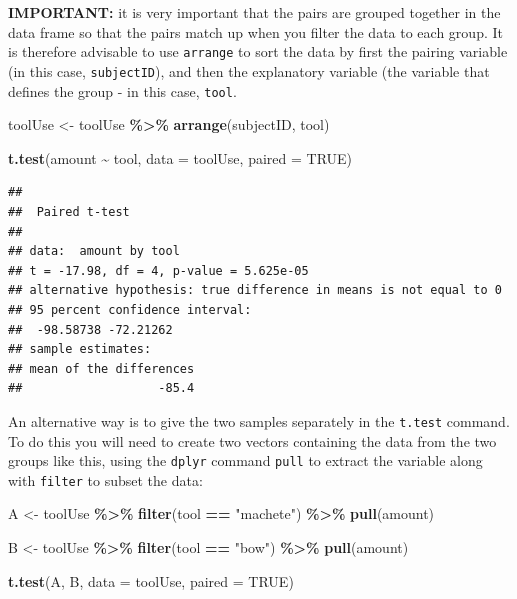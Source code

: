 \documentclass[
  a4paperpaper,
]{book}
\newenvironment{Shaded}{\begin{snugshade}}{\end{snugshade}}
\newcommand{\DataTypeTok}[1]{\textcolor[rgb]{0.13,0.29,0.53}{#1}}
\newcommand{\KeywordTok}[1]{\textcolor[rgb]{0.13,0.29,0.53}{\textbf{#1}}}
\newcommand{\NormalTok}[1]{#1}
\newcommand{\OperatorTok}[1]{\textcolor[rgb]{0.81,0.36,0.00}{\textbf{#1}}}
\newcommand{\OtherTok}[1]{\textcolor[rgb]{0.56,0.35,0.01}{#1}}
\newcommand{\StringTok}[1]{\textcolor[rgb]{0.31,0.60,0.02}{#1}}
\begin{document}
\textbf{IMPORTANT:} it is very important that the pairs are grouped together in the data frame so that the pairs match up when you filter the data to each group. It is therefore advisable to use \texttt{arrange} to sort the data by first the pairing variable (in this case, \texttt{subjectID}), and then the explanatory variable (the variable that defines the group - in this case, \texttt{tool}.

\begin{Shaded}
\begin{Highlighting}[]
\NormalTok{toolUse \textless{}{-}}\StringTok{ }\NormalTok{toolUse }\OperatorTok{\%\textgreater{}\%}\StringTok{ }
\StringTok{  }\KeywordTok{arrange}\NormalTok{(subjectID, tool)}

\KeywordTok{t.test}\NormalTok{(amount }\OperatorTok{\textasciitilde{}}\StringTok{ }\NormalTok{tool, }\DataTypeTok{data =}\NormalTok{ toolUse, }\DataTypeTok{paired =} \OtherTok{TRUE}\NormalTok{)}
\end{Highlighting}
\end{Shaded}

\begin{verbatim}
## 
## 	Paired t-test
## 
## data:  amount by tool
## t = -17.98, df = 4, p-value = 5.625e-05
## alternative hypothesis: true difference in means is not equal to 0
## 95 percent confidence interval:
##  -98.58738 -72.21262
## sample estimates:
## mean of the differences 
##                   -85.4
\end{verbatim}

An alternative way is to give the two samples separately in the \texttt{t.test} command. To do this you will need to create two vectors containing the data from the two groups like this, using the \texttt{dplyr} command \texttt{pull} to extract the variable along with \texttt{filter} to subset the data:

\begin{Shaded}
\begin{Highlighting}[]
\NormalTok{A \textless{}{-}}\StringTok{ }\NormalTok{toolUse }\OperatorTok{\%\textgreater{}\%}\StringTok{ }
\StringTok{  }\KeywordTok{filter}\NormalTok{(tool }\OperatorTok{==}\StringTok{ "machete"}\NormalTok{) }\OperatorTok{\%\textgreater{}\%}\StringTok{ }
\StringTok{  }\KeywordTok{pull}\NormalTok{(amount)}

\NormalTok{B \textless{}{-}}\StringTok{ }\NormalTok{toolUse }\OperatorTok{\%\textgreater{}\%}\StringTok{ }
\StringTok{  }\KeywordTok{filter}\NormalTok{(tool }\OperatorTok{==}\StringTok{ "bow"}\NormalTok{) }\OperatorTok{\%\textgreater{}\%}\StringTok{ }
\StringTok{  }\KeywordTok{pull}\NormalTok{(amount)}

\KeywordTok{t.test}\NormalTok{(A, B, }\DataTypeTok{data =}\NormalTok{ toolUse, }\DataTypeTok{paired =} \OtherTok{TRUE}\NormalTok{)}
\end{Highlighting}
\end{Shaded}
\end{document}
